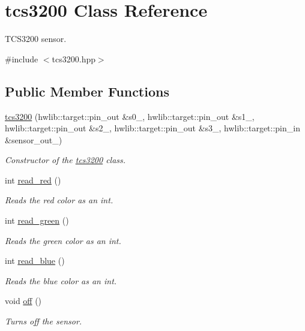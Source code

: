 \hypertarget{classtcs3200}{}\section{tcs3200 Class Reference}
\label{classtcs3200}


T\+C\+S3200 sensor.  




{\ttfamily \#include $<$tcs3200.\+hpp$>$}

\subsection*{Public Member Functions}
\begin{DoxyCompactItemize}
\item 
\hyperlink{classtcs3200_a13e30ee8c4783f1db994fc2cb67e66f3}{tcs3200} (hwlib\+::target\+::pin\+\_\+out \&s0\+\_\+, hwlib\+::target\+::pin\+\_\+out \&s1\+\_\+, hwlib\+::target\+::pin\+\_\+out \&s2\+\_\+, hwlib\+::target\+::pin\+\_\+out \&s3\+\_\+, hwlib\+::target\+::pin\+\_\+in \&sensor\+\_\+out\+\_\+)
\begin{DoxyCompactList}\small\item\em Constructor of the \hyperlink{classtcs3200}{tcs3200} class. \end{DoxyCompactList}\item 
int \hyperlink{classtcs3200_a632de7a9235551be40c92c270eb71c99}{read\+\_\+red} ()
\begin{DoxyCompactList}\small\item\em Reads the red color as an int. \end{DoxyCompactList}\item 
int \hyperlink{classtcs3200_aab1dcfd5721bd9b8fb4b749e72cefad9}{read\+\_\+green} ()
\begin{DoxyCompactList}\small\item\em Reads the green color as an int. \end{DoxyCompactList}\item 
int \hyperlink{classtcs3200_a3601b40b4b7f40625e9e1acb4cb0f7ff}{read\+\_\+blue} ()
\begin{DoxyCompactList}\small\item\em Reads the blue color as an int. \end{DoxyCompactList}\item 
void \hyperlink{classtcs3200_a6dbd5dccc83337cf3cc14b8fe197aed5}{off} ()
\begin{DoxyCompactList}\small\item\em Turns off the sensor. \end{DoxyCompactList}\item 

\end{DoxyCompactItemize}
